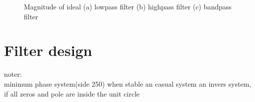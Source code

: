 \begin{figure}[H]
\begin{subfigure}[b]{0.32\textwidth}
\caption{}
    \end{subfigure}

\caption{Magnitude of ideal (a) lowpass filter (b) highpass filter (c) bandpass filter}
\label{fig:ideal}
\end{figure}

\section{Filter design}

noter: \\
minimum phase system(side 250) when stable an casual system an invers system, if all zeros and pole are inside the unit circle 